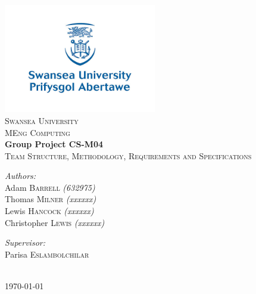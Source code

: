 \begin{titlepage}

\begin{center}
\includegraphics[width=0.5\textwidth]{img/University_Logo}\\

\textsc{\LARGE Swansea University }\\[0.5cm]
\textsc{\large MEng Computing }\\[2cm]

{ \huge \bfseries Group Project CS-M04}\\[0.2cm]
\textsc{\large Team Structure, Methodology, Requirements and Specifications}\\[1.5cm]

\begin{minipage}{0.4\textwidth}
\begin{flushleft}

\emph{Authors:}\\
Adam \textsc{Barrell} {\scriptsize \emph{(632975)}} \\
Thomas \textsc{Milner} {\scriptsize \emph{(xxxxxx)}} \\
Lewis \textsc{Hancock} {\scriptsize \emph{(xxxxxx)}} \\
Christopher \textsc{Lewis} {\scriptsize \emph{(xxxxxx)}} \\

\end{flushleft}
\end{minipage}
\begin{minipage}{0.4\textwidth}
\begin{flushright}

\emph{Supervisor:}\\
Parisa \textsc{Eslambolchilar}

\end{flushright}
\end{minipage}\\[1.3cm]

{\today}
\end{center}

\end{titlepage}